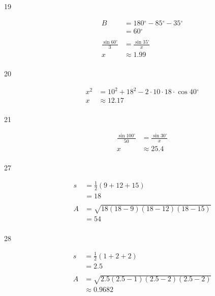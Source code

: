 \documentclass{exam}
\newcommand{\dg}{\ensuremath{^\circ}}
\begin{document}
\begin{description}
      \item[19]
        \begin{align*}
          B & = 180 \dg - 85 \dg - 35 \dg \\
            & = 60 \dg \\
            \\
          \frac{\sin 60 \dg}{3} & = \frac{\sin 35 \dg}{x} \\
          x                     & \approx \boxed{ 1.99 } \\
        \end{align*}

      \item[20]
        \begin{align*}
          x^2 & = 10^2 + 18^2 - 2 \cdot 10 \cdot 18 \cdot \cos 40 \dg \\
          x   & \approx \boxed{ 12.17 } \\
        \end{align*}

      \item[21]
        \begin{align*}
          \frac{\sin 100 \dg}{50} & = \frac{\sin 30 \dg}{x} \\
          x                       & \approx \boxed{ 25.4 } \\
        \end{align*}

      \item[27]
        \begin{align*}
          s  & = \frac{1}{2}(9 + 12 + 15) \\
             & = 18 \\
          \\
          A  & = \sqrt{18 (18 - 9)(18 - 12) (18 - 15)} \\
             & = \boxed{ 54 } \\
        \end{align*}

      \item[28]
        \begin{align*}
          s  & = \frac{1}{2}(1 + 2 + 2) \\
             & = 2.5 \\
          \\
          A  & = \sqrt{2.5 (2.5 - 1)(2.5 - 2) (2.5 - 2)} \\
             & \approx \boxed{ 0.9682 } \\
        \end{align*}


\end{description}
\end{document}
